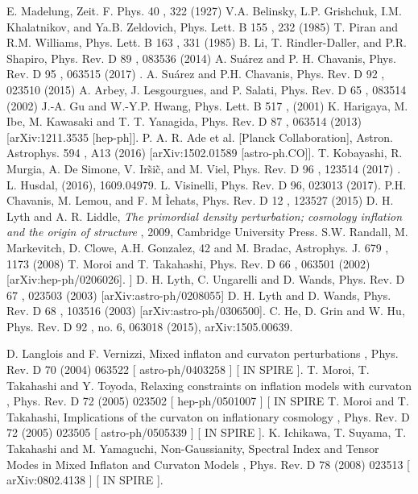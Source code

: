\documentclass[amssymb,twocolumn,prd,nofootinbib,showpacs]{revtex4-1}
\begin{document}
\begin{thebibliography}{9}
  E. Madelung, Zeit. F. Phys.
40
, 322 (1927)
  V.A.  Belinsky,  L.P.  Grishchuk,  I.M.  Khalatnikov,  and
Ya.B. Zeldovich, Phys. Lett. B
155
, 232 (1985)
  T.  Piran  and  R.M.  Williams,  Phys.  Lett.  B
163
,  331
(1985)
  B. Li, T. Rindler-Daller, and P.R. Shapiro, Phys. Rev.
D
89
, 083536 (2014)
 A. Su\'arez and P. H. Chavanis,
Phys. Rev. D
95
, 063515
(2017)
.
 A. Su\'arez and P.H. Chavanis, Phys. Rev. D
92
, 023510
(2015)
  A. Arbey, J. Lesgourgues, and P. Salati, Phys. Rev. D
65
, 083514 (2002)
  J.-A.  Gu  and  W.-Y.P.  Hwang,  Phys.  Lett.  B
517
,
(2001)
     K. Harigaya, M. Ibe, M. Kawasaki and T. T. Yanagida, Phys. Rev. D
87
, 063514
(2013) [arXiv:1211.3535 [hep-ph]].
  P.   A.   R.   Ade
et   al.
[Planck   Collaboration],    Astron.   Astrophys.
594
,    A13   (2016)
[arXiv:1502.01589 [astro-ph.CO]].
T. Kobayashi, R. Murgia, A. De Simone, V. Ir\~si\~c, and M.
Viel,
Phys. Rev. D
96
, 123514 (2017)
.
L. Husdal, (2016), 1609.04979.
L. Visinelli,
Phys. Rev. D 96, 023013 (2017).
  P.H. Chavanis, M. Lemou, and F. M Ìehats, Phys. Rev.
D
12
, 123527 (2015)
D. H. Lyth and A. R. Liddle, \textit{The primordial density perturbation; cosmology inflation and the origin of structure} , 2009, Cambridge University Press.
  S.W. Randall, M. Markevitch, D. Clowe, A.H. Gonzalez,
42
and M. Bradac, Astrophys. J.
679
, 1173 (2008)
T. Moroi and T. Takahashi, Phys. Rev. D
66
, 063501 (2002) [arXiv:hep-ph/0206026].
] D. H. Lyth, C. Ungarelli and D. Wands, Phys. Rev. D
67
, 023503 (2003)
[arXiv:astro-ph/0208055]
 D. H. Lyth and D. Wands, Phys. Rev. D
68
, 103516 (2003) [arXiv:astro-ph/0306500].
 C.  He,  D.  Grin  and  W.  Hu,  Phys.  Rev.  D
92
,  no.  6,
063018 (2015), arXiv:1505.00639.

 D. Langlois and F. Vernizzi,
Mixed inflaton and curvaton perturbations
,
Phys. Rev.
D 70
(2004) 063522
[
astro-ph/0403258
] [
IN
SPIRE
].
 T. Moroi, T. Takahashi and Y. Toyoda,
Relaxing constraints on inflation models with curvaton
,
Phys. Rev.
D 72
(2005) 023502
[
hep-ph/0501007
] [
IN
SPIRE
 T. Moroi and T. Takahashi,
Implications of the curvaton on inflationary cosmology
,
Phys. Rev.
D 72
(2005) 023505
[
astro-ph/0505339
] [
IN
SPIRE
].
 K. Ichikawa, T. Suyama, T. Takahashi and M. Yamaguchi,
Non-Gaussianity, Spectral Index
and Tensor Modes in Mixed Inflaton and Curvaton Models
,
Phys. Rev.
D 78
(2008) 023513
[
arXiv:0802.4138
] [
IN
SPIRE
].


\end{thebibliography}
\end{document}
